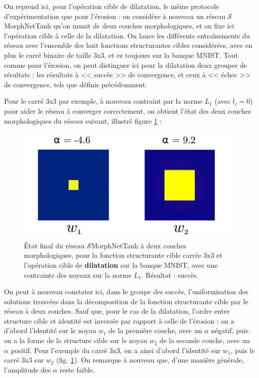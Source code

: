 On reprend ici, pour l'opération cible de dilatation, le même protocole d'expérimentation que pour l'érosion : on considère à nouveau un réseau $\mathcal{S}$MorphNetTanh qu'on munit de deux couches morphologiques, et on fixe ici l'opération cible à celle de la dilatation. On lance les différents entraînements du réseau avec l'ensemble des huit fonctions structurantes cibles considérées, avec en plus le carré binaire de taille 3x3, et ce toujours sur la banque MNIST. Tout comme pour l'érosion, on peut distinguer ici pour la dilatation deux groupes de résultats : les résultats à << succès >> de convergence, et ceux à << échec >> de convergence, tels que définis précédemment.


\newpage

\noindent Pour le carré 3x3 par exemple, à nouveau contraint par la norme $L_1$ (avec $l_c=0$) pour aider le réseau à converger correctement, on obtient l'état des deux couches morphologiques du réseau suivant, illustré figure \ref{fig:square_success_dilation} : \\

\begin{figure}[!htp]
  \begin{center}
    \includegraphics[width=0.36\linewidth]{parts/4-analyse_des_reseaux/deux_couches_pour_OPfondamentale/figures/square_success_dilation.pdf}
    \vspace{0.6mm}
    \caption{ \centering État final du réseau $\mathcal{S}$MorphNetTanh à deux couches morphologiques, pour la fonction structurante cible carrée 3x3 et l'opération cible de \textbf{dilatation} sur la banque MNIST, avec une contrainte des noyaux sur la norme $L_1$. Résultat : succès.}
    \label{fig:square_success_dilation}
  \end{center}
\end{figure}

\vspace{-2.0mm}
On peut à nouveau constater ici, dans le groupe des succès, l'uniformisation des solutions trouvées dans la décomposition de la fonction structurante cible par le réseau à deux couches. Sauf que, pour le cas de la dilatation, l'ordre entre structure cible et identité est inversée par rapport à celle de l'érosion : on a d'abord l'identité sur le noyau $w_1$ de la première couche, avec un $\alpha$ négatif, puis on a la forme de la structure cible sur le noyau $w_2$ de la seconde couche, avec un $\alpha$ positif. Pour l'exemple du carré 3x3, on a ainsi d'abord l'identité sur $w_1$, puis le carré 3x3 sur $w_2$ (fig. \ref{fig:square_success_dilation}). On remarque à nouveau que, d'une manière générale, l'amplitude des $\alpha$ reste faible.

\vspace{2.2mm}
